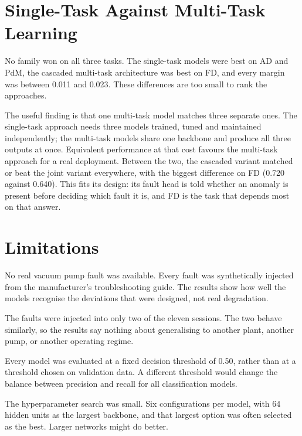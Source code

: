 \section{Single-Task Against Multi-Task Learning} \label{sec:disc_stl_mtl}

No family won on all three tasks. The single-task models were best on AD and PdM, the cascaded multi-task
architecture was best on FD, and every margin was between 0.011 and 0.023. These differences are too small
to rank the approaches.

The useful finding is that one multi-task model matches three separate ones. The single-task approach needs
three models trained, tuned and maintained independently; the multi-task models share one backbone and
produce all three outputs at once. Equivalent performance at that cost favours the multi-task approach for
a real deployment. Between the two, the cascaded variant matched or beat the joint variant everywhere, with
the biggest difference on FD (0.720 against 0.640). This fits its design: its fault head is told whether an
anomaly is present before deciding which fault it is, and FD is the task that depends most on that answer.

\section{Limitations} \label{sec:disc_limitations}

No real vacuum pump fault was available. Every fault was synthetically injected from the manufacturer's
troubleshooting guide. The results show how well the models recognise the deviations that were designed,
not real degradation.

The faults were injected into only two of the eleven sessions. The two behave similarly, so the results say
nothing about generalising to another plant, another pump, or another operating regime.

Every model was evaluated at a fixed decision threshold of 0.50, rather than at a threshold chosen on
validation data. A different threshold would change the balance between precision and recall for all
classification models.

The hyperparameter search was small. Six configurations per model, with 64 hidden units as the largest
backbone, and that largest option was often selected as the best. Larger networks might do better.